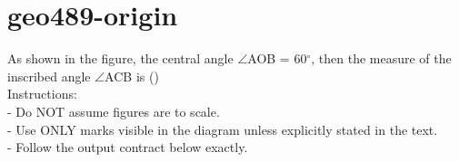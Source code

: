\documentclass[12pt]{article}
\begin{document}
\section*{geo489-origin}
\noindent\begin{minipage}{\textwidth}
\setlength{\parskip}{4pt}
As shown in the figure, the central angle \ensuremath{\angle }AOB = 60\ensuremath{^\circ}, then the measure of the inscribed angle \ensuremath{\angle }ACB is ()\\
Instructions:\\
- Do NOT assume figures are to scale.\\
- Use ONLY marks visible in the diagram unless explicitly stated in the text.\\
- Follow the output contract below exactly.\\
\end{minipage}
\end{document}
